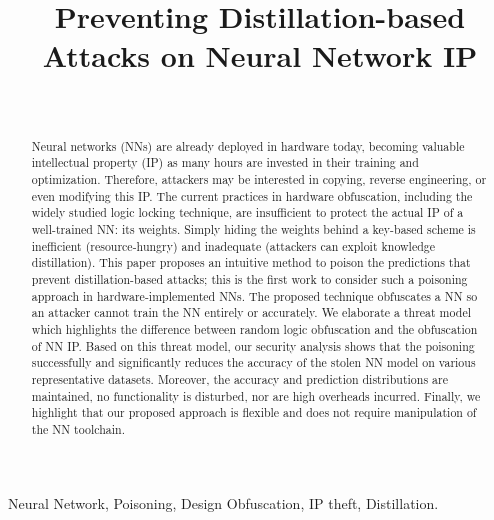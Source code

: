 \documentclass[10pt, twocolumn, conference]{IEEEtran}
\begin{document}
\title{Preventing Distillation-based Attacks on Neural Network IP}

\author{
\\\vspace*{-1.2cm}} 

\maketitle

\begin{abstract} 
Neural networks (NNs) are already deployed in hardware today, becoming valuable intellectual property (IP) as many hours are invested in their training and optimization. Therefore, attackers may be interested in copying, reverse engineering, or even modifying this IP. The current practices in hardware obfuscation, including the widely studied logic locking technique, are insufficient to protect the actual IP of a well-trained NN: its weights. Simply hiding the weights behind a key-based scheme is inefficient (resource-hungry) and inadequate (attackers can exploit knowledge distillation). This paper proposes an intuitive method to poison the predictions that prevent distillation-based attacks; this is the first work to consider such a poisoning approach in hardware-implemented NNs. The proposed technique obfuscates a NN so an attacker cannot train the NN entirely or accurately. We elaborate a threat model which highlights the difference between random logic obfuscation and the obfuscation of NN IP. Based on this threat model, our security analysis shows that the poisoning successfully and significantly reduces the accuracy of the stolen NN model on various representative datasets. Moreover, the accuracy and prediction distributions are maintained, no functionality is disturbed, nor are high overheads incurred. Finally, we highlight that our proposed approach is flexible and does not require manipulation of the NN toolchain.\end{abstract}

\begin{IEEEkeywords} Neural Network, Poisoning, Design Obfuscation, IP theft, Distillation.
\end{IEEEkeywords}
\end{document}

